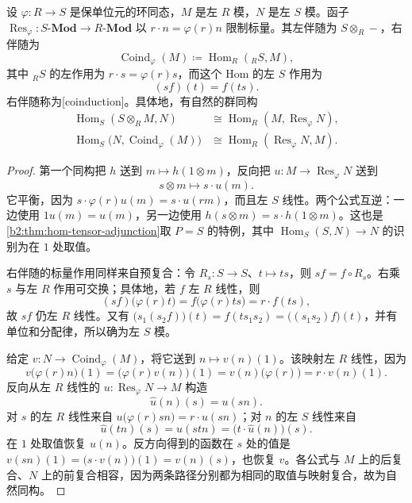 \begin{proposition}[限制标量的左右伴随]\label{b2:prop:scalar-change-adjunctions}
	设 \(\varphi:R\to S\) 是保单位元的环同态，\(M\) 是左 \(R\) 模，\(N\) 是左 \(S\) 模。函子 \(\operatorname{Res}_{\varphi}:S\text{-}\mathbf{Mod}\to R\text{-}\mathbf{Mod}\) 以 \(r\cdot n=\varphi(r)n\) 限制标量。其左伴随为 \(S\otimes_R-\)，右伴随为
	\[
		\operatorname{Coind}_{\varphi}(M) \coloneqq\operatorname{Hom}_R({}_RS,M),
	\]
	其中 \({}_RS\) 的左作用为 \(r\cdot s=\varphi(r)s\)，而这个 Hom 的左 \(S\) 作用为
	\begin{equation}\label{b2:eq:coinduced-action}
		(s f)(t)=f(ts).
	\end{equation}
	右伴随称为[coinduction]。具体地，有自然的群同构
	\[
		\begin{aligned}
			\operatorname{Hom}_S(S\otimes_RM,N) &\cong\operatorname{Hom}_R(M,\operatorname{Res}_{\varphi}N),\\
			\operatorname{Hom}_S\bigl(N,\operatorname{Coind}_{\varphi}(M)\bigr) &\cong\operatorname{Hom}_R(\operatorname{Res}_{\varphi}N,M).
		\end{aligned}
	\]
\end{proposition}
\begin{proof}
	第一个同构把 \(h\) 送到 \(m\mapsto h(1\otimes m)\)，反向把 \(u:M\to\operatorname{Res}_{\varphi}N\) 送到
	\[
		s\otimes m\longmapsto s\cdot u(m).
	\]
	它平衡，因为 \(s\cdot\varphi(r)u(m)=s\cdot u(rm)\)，而且左 \(S\) 线性。两个公式互逆：一边使用 \(1u(m)=u(m)\)，另一边使用 \(h(s\otimes m)=s\cdot h(1\otimes m)\)。这也是\cref{b2:thm:hom-tensor-adjunction}取 \(P=S\) 的特例，其中 \(\operatorname{Hom}_S(S,N)\to N\) 的识别为在 \(1\) 处取值。

	右伴随的标量作用同样来自预复合：令 \(R_s:S\to S\)、\(t\mapsto ts\)，则 \(sf=f\circ R_s\)。右乘 \(s\) 与左 \(R\) 作用可交换；具体地，若 \(f\) 左 \(R\) 线性，则
	\[
		(sf)\bigl(\varphi(r)t\bigr)=f\bigl(\varphi(r)ts\bigr)=r\cdot f(ts),
	\]
	故 \(sf\) 仍左 \(R\) 线性。又有 \(\bigl(s_1(s_2f)\bigr)(t)=f(ts_1s_2)=\bigl((s_1s_2)f\bigr)(t)\)，并有单位和分配律，所以确为左 \(S\) 模。

	给定 \(v:N\to\operatorname{Coind}_{\varphi}(M)\)，将它送到 \(n\mapsto v(n)(1)\)。该映射左 \(R\) 线性，因为
	\[
		v\bigl(\varphi(r)n\bigr)(1) =\bigl(\varphi(r)v(n)\bigr)(1) =v(n)\bigl(\varphi(r)\bigr)=r\cdot v(n)(1).
	\]
	反向从左 \(R\) 线性的 \(u:\operatorname{Res}_{\varphi}N\to M\) 构造
	\[
		\widehat u(n)(s)=u(sn).
	\]
	对 \(s\) 的左 \(R\) 线性来自 \(u\bigl(\varphi(r)sn\bigr)=r\cdot u(sn)\)；对 \(n\) 的左 \(S\) 线性来自
	\[
		\widehat u(tn)(s)=u(stn)=\bigl(t\cdot\widehat u(n)\bigr)(s).
	\]
	在 \(1\) 处取值恢复 \(u(n)\)。反方向得到的函数在 \(s\) 处的值是 \(v(sn)(1)=\bigl(s\cdot v(n)\bigr)(1)=v(n)(s)\)，也恢复 \(v\)。各公式与 \(M\) 上的后复合、\(N\) 上的前复合相容，因为两条路径分别都为相同的取值与映射复合，故为自然同构。
\end{proof}

